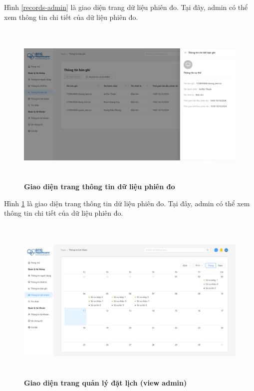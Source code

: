 Hình \ref{records-admin} là giao diện trang dữ liệu phiên đo. Tại đây, admin có thể xem thông tin chi tiết của dữ liệu phiên đo.

\begin{figure}[H]
	\centering
	\includegraphics[width=15cm,height=8cm]{Images/admin_ui/record-info.png}
	\caption[Giao diện trang thông tin dữ liệu phiên đo]{\bfseries \fontsize{12pt}{0pt}\selectfont Giao diện trang thông tin dữ liệu phiên đo}
	\label{record-info-admin}
\end{figure}

Hình \ref{record-info-admin} là giao diện trang thông tin dữ liệu phiên đo. Tại đây, admin có thể xem thông tin chi tiết của dữ liệu phiên đo.

\begin{figure}[H]
	\centering
	\includegraphics[width=15cm,height=8cm]{Images/admin_ui/schedule.png}
	\caption[Giao diện trang quản lý đặt lịch]{\bfseries \fontsize{12pt}{0pt}\selectfont Giao diện trang quản lý đặt lịch (view admin)}
	\label{schedules-admin}
\end{figure}

